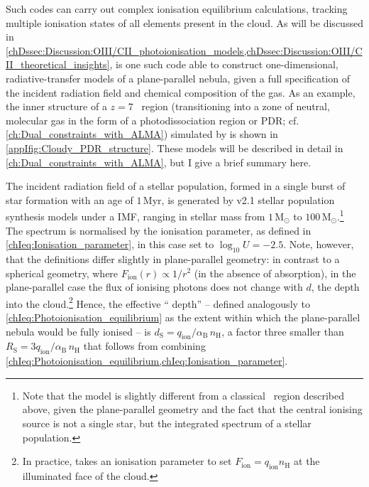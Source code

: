 Such codes can carry out complex ionisation equilibrium calculations, tracking multiple ionisation states of all elements present in the cloud. As will be discussed in \cref{chDssec:Discussion:OIII/CII_photoionisation_models,chDssec:Discussion:OIII/CII_theoretical_insights},  \citep[e.g.][]{2017RMxAA..53..385F} is one such code able to construct one-dimensional, radiative-transfer models of a plane-parallel nebula, given a full specification of the incident radiation field and chemical composition of the gas. As an example, the inner structure of a $z = 7$ \HII\ region (transitioning into a zone of neutral, molecular gas in the form of a photodissociation region or PDR; cf. \cref{ch:Dual_constraints_with_ALMA}) simulated by  is shown in \cref{appIfig:Cloudy_PDR_structure}. These models will be described in detail in \cref{ch:Dual_constraints_with_ALMA}, but I give a brief summary here.

The incident radiation field of a stellar population, formed in a single burst of star formation with an age of $1 \, \mathrm{Myr}$, is generated by  v2.1 stellar population synthesis models \citep[including binary stars;][]{2017PASA...34...58E} under a \citeauthor{1955ApJ...121..161S} IMF, ranging in stellar mass from $1 \, \mathrm{M_\odot}$ to $100 \, \mathrm{M_\odot}$.\footnote{Note that the model is slightly different from a classical \HII\ region described above, given the plane-parallel geometry and the fact that the central ionising source is not a single star, but the integrated spectrum of a stellar population.} The spectrum is normalised by the ionisation parameter, as defined in \cref{chIeq:Ionisation_parameter}, in this case set to $\log_{10} U = -2.5$. Note, however, that the definitions differ slightly in plane-parallel geometry: in contrast to a spherical geometry, where $F_\text{ion} (r) \propto 1/r^2$ (in the absence of absorption), in the plane-parallel case the flux of ionising photons does not change with $d$, the depth into the cloud.\footnote{In practice,  takes an ionisation parameter to set $F_\text{ion} = q_\text{ion} n_\text{H}$ at the illuminated face of the cloud.} Hence, the effective ``\citeauthor{1939ApJ....89..526S} depth'' -- defined analogously to \cref{chIeq:Photoionisation_equilibrium} as the extent within which the plane-parallel nebula would be fully ionised -- is $d_\text{S} = q_\text{ion}/\alpha_\text{B} \, n_\text{H}$, a factor three smaller than $R_\text{S} = 3q_\text{ion}/\alpha_\text{B} \, n_\text{H}$ that follows from combining \cref{chIeq:Photoionisation_equilibrium,chIeq:Ionisation_parameter}.